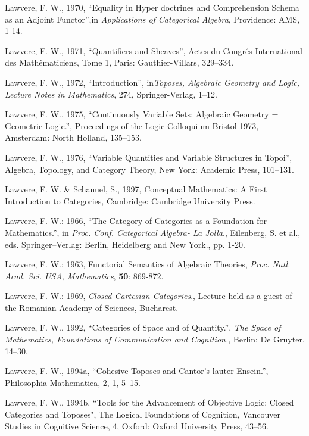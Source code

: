 \documentclass[12pt]{article}
\theoremstyle{plain}
\theoremstyle{definition}
\numberwithin{equation}{section}
\begin{document}
\begin{thebibliography}{99}
Lawvere, F. W., 1970, ``Equality in Hyper doctrines and Comprehension Schema as an Adjoint Functor'',in {\em Applications of Categorical Algebra}, Providence: AMS, 1-14.  

Lawvere, F. W., 1971, ``Quantifiers and Sheaves'', Actes du Congr\'es International des Math\'ematiciens, Tome 1, Paris: Gauthier-Villars, 329--334. 

Lawvere, F. W., 1972, ``Introduction'', in{\em Toposes, Algebraic Geometry and Logic, Lecture Notes in Mathematics}, 274, Springer-Verlag, 1--12.  

Lawvere, F. W., 1975, ``Continuously Variable Sets: Algebraic Geometry = Geometric Logic.'', Proceedings of the Logic Colloquium Bristol 1973, Amsterdam: North Holland, 135--153. 

Lawvere, F. W., 1976, ``Variable Quantities and Variable Structures in Topoi'', Algebra, Topology, and Category Theory, New York: Academic Press, 101--131. 

Lawvere, F. W. \& Schanuel, S., 1997, Conceptual Mathematics: A First Introduction to Categories, Cambridge: Cambridge University Press. 

Lawvere, F. W.: 1966, ``The Category of Categories as a Foundation for Mathematics.'', in
\emph{Proc. Conf. Categorical Algebra- La Jolla}., Eilenberg, S. et al., eds. Springer--Verlag:
Berlin, Heidelberg and New York., pp. 1-20.

Lawvere, F. W.: 1963, Functorial Semantics of Algebraic Theories,
\emph{Proc. Natl. Acad. Sci. USA, Mathematics}, \textbf{50}: 869-872.

Lawvere, F. W.: 1969, \emph{Closed Cartesian Categories}., Lecture held as a guest of the
Romanian Academy of Sciences, Bucharest.

Lawvere, F. W., 1992, ``Categories of Space and of Quantity.'', {\em The Space of Mathematics, Foundations of Communication and Cognition.}, Berlin: De Gruyter, 14--30.  

Lawvere, F. W., 1994a, ``Cohesive Toposes and Cantor's lauter Ensein.'', Philosophia Mathematica, 2, 1, 5--15. 

Lawvere, F. W., 1994b, ``Tools for the Advancement of Objective Logic: Closed Categories and Toposes", The Logical Foundations of Cognition, Vancouver Studies in Cognitive Science, 4, Oxford: Oxford University Press, 43--56.  


\end{thebibliography}
\end{document}
